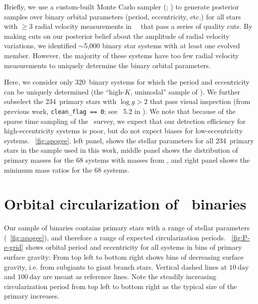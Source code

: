 \documentclass[modern, letterpaper]{aastex62}
\newcommand{\apogee}{\project{\acronym{APOGEE}}}
\newcommand{\DR}{\acronym{DR14}}
\newcommand{\logg}{\ensuremath{\log g}}
\newcommand{\nunimodal}{320}
\newcommand{\nclean}{234}
\begin{document}
Briefly, we use a custom-built Monte Carlo sampler (;
\citealt{Price-Whelan:2017}) to generate posterior samples over binary orbital
parameters (period, eccentricity, etc.) for all stars with $\geq 3$ radial
velocity measurements in \apogee\ \DR\ that pass a series of quality cuts.
By making cuts on our posterior belief about the amplitude of radial velocity
variations, we identified $\sim$5,000 binary star systems with at least one
evolved member.
However, the majority of these systems have too few radial velocity measurements
to uniquely determine the binary orbital parameters.

Here, we consider only \nunimodal\ binary systems for which the period and
eccentricity can be uniquely determined (the ``high-$K$, unimodal'' sample of
\citealt{Price-Whelan:2018}).
We further subselect the \nclean\ primary stars with $\logg > 2$ that pass
visual inspection (from previous work, \texttt{clean\_flag == 0}; see
\sectionname~5.2 in \citealt{Price-Whelan:2018}).
We note that because of the sparse time sampling of the \apogee\ survey, we
expect that our detection efficiency for high-eccentricity systems is poor, but
do not expect biases for low-eccentricity systems.
\figurename~\ref{fig:apogee}, left panel, shows the stellar parameters for all
\nclean\ primary stars in the sample used in this work, middle panel shows the
distribution of primary masses for the 68 systems with masses from
\cite{Ness:2015}, and right panel shows the minimum mass ratios for the 68
systems.


\section{Orbital circularization of \apogee\ binaries}
\label{sec:results}

Our sample of binaries contains primary stars with a range of stellar parameters
(\figurename~\ref{fig:apogee}), and therefore a range of expected
circularization periods.
\figurename~\ref{fig:P-e-grid} shows orbital period and eccentricity for all
systems in bins of primary surface gravity:
From top left to bottom right shows bins of decreasing surface gravity, i.e.
from subgiants to giant branch stars.
Vertical dashed lines at $10~\textrm{day}$ and $100~\textrm{day}$ are meant as
reference lines.
Note the steadily increasing circularization period from top left to bottom
right as the typical size of the primary increases.
\end{document}
